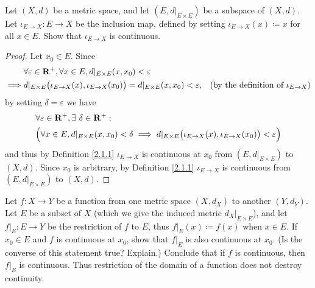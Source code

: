 \begin{exercise}\label{ex 2.1.5}
    Let \((X, d)\) be a metric space, and let \((E, d|_{E \times E})\) be a subspace of \((X, d)\).
    Let \(\iota_{E \to X} : E \to X\) be the inclusion map, defined by setting \(\iota_{E \to X}(x) \coloneqq x\) for all \(x \in E\).
    Show that \(\iota_{E \to X}\) is continuous.
\end{exercise}

\begin{proof}
    Let \(x_0 \in E\).
    Since
    \begin{align*}
                 & \forall \varepsilon \in \mathbf{R}^+, \forall x \in E, d|_{E \times E}(x, x_0) < \varepsilon                                                                           \\
        \implies & d|_{E \times E}\big(\iota_{E \to X}(x), \iota_{E \to X}(x_0)\big) = d|_{E \times E}(x, x_0) < \varepsilon, & \text{(by the definition of \(\iota_{E \to X}\))}
    \end{align*}
    by setting \(\delta = \varepsilon\) we have
    \begin{align*}
         & \forall \varepsilon \in \mathbf{R}^+, \exists\ \delta \in \mathbf{R}^+ :                                                                                             \\
         & \Big(\forall x \in E, d|_{E \times E}(x, x_0) < \delta \implies d|_{E \times E}\big(\iota_{E \to X}(x), \iota_{E \to X}(x_0)\big) < \varepsilon\Big)
    \end{align*}
    and thus by Definition \ref{2.1.1} \(\iota_{E \to X}\) is continuous at \(x_0\) from \((E, d|_{E \times E})\) to \((X, d)\).
    Since \(x_0\) is arbitrary, by Definition \ref{2.1.1} \(\iota_{E \to X}\) is continuous from \((E, d|_{E \times E})\) to \((X, d)\).
\end{proof}

\begin{exercise}\label{ex 2.1.6}
    Let \(f : X \to Y\) be a function from one metric space \((X, d_X)\) to another \((Y, d_Y)\).
    Let \(E\) be a subset of \(X\) (which we give the induced metric \(d_X|_{E \times E}\)), and let \(f|_E : E \to Y\) be the restriction of \(f\) to \(E\), thus \(f|_E(x) \coloneqq f(x)\) when \(x \in E\).
    If \(x_0 \in E\) and \(f\) is continuous at \(x_0\), show that \(f|_E\) is also continuous at \(x_0\).
    (Is the converse of this statement true? Explain.)
    Conclude that if \(f\) is continuous, then \(f|_E\) is continuous.
    Thus restriction of the domain of a function does not destroy continuity.
\end{exercise}

